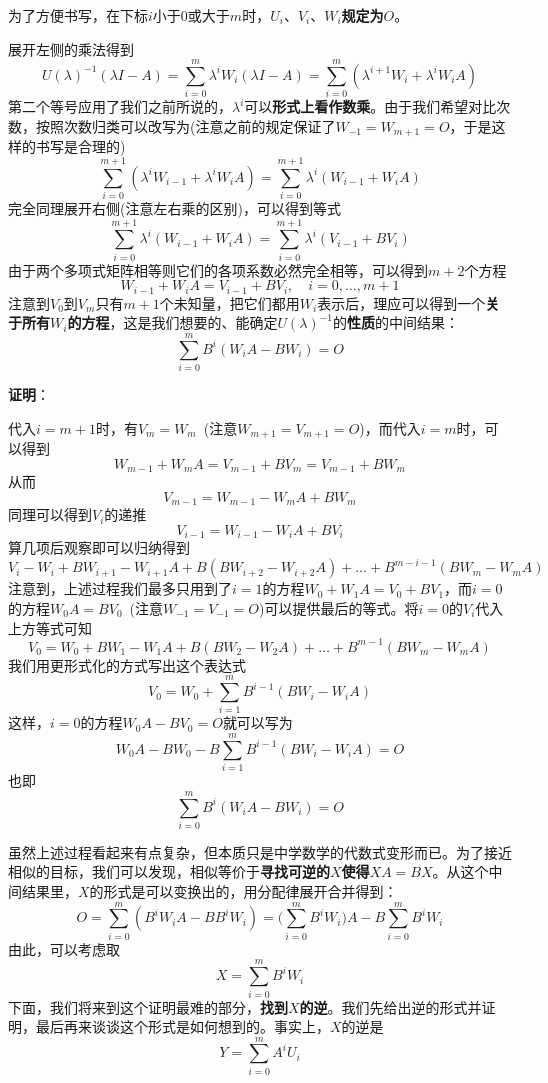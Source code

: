 \documentclass[a4paper,UTF8,fontset=windows,AutoFakeBold]{ctexart}
\newcommand{\proo}[1]{{\vspace{5pt}\kaishu\noindent\textbf{证明}：\vspace{-3pt}
\begin{compactitem}
    \item[] #1
\end{compactitem}
}}
\begin{document}
为了方便书写，在下标$i$小于0或大于$m$时，$U_i$、$V_i$、$W_i$\textbf{规定为}$O$。

展开左侧的乘法得到
$$U(\lambda)^{-1}(\lambda I-A)=\sum_{i=0}^m\lambda^iW_i(\lambda I-A)=\sum_{i=0}^m(\lambda^{i+1}W_i+\lambda^iW_iA)$$
第二个等号应用了我们之前所说的，$\lambda^i$可以\textbf{形式上看作数乘}。由于我们希望对比次数，按照次数归类可以改写为(注意之前的规定保证了$W_{-1}=W_{m+1}=O$，于是这样的书写是合理的)
$$\sum_{i=0}^{m+1}(\lambda^iW_{i-1}+\lambda^iW_iA)=\sum_{i=0}^{m+1}\lambda^i(W_{i-1}+W_iA)$$
完全同理展开右侧(注意左右乘的区别)，可以得到等式
$$\sum_{i=0}^{m+1}\lambda^i(W_{i-1}+W_iA)=\sum_{i=0}^{m+1}\lambda^i(V_{i-1}+BV_i)$$
由于两个多项式矩阵相等则它们的各项系数必然完全相等，可以得到$m+2$个方程
$$W_{i-1}+W_iA=V_{i-1}+BV_i,\quad i=0,\dots,m+1$$
注意到$V_0$到$V_m$只有$m+1$个未知量，把它们都用$W_i$表示后，理应可以得到一个\textbf{关于所有$W_i$的方程}，这是我们想要的、能确定$U(\lambda)^{-1}$的\textbf{性质}的中间结果：
$$\sum_{i=0}^mB^i(W_iA-BW_i)=O$$

\proo{
    代入$i=m+1$时，有$V_m=W_m$\ (注意$W_{m+1}=V_{m+1}=O$)，而代入$i=m$时，可以得到
    $$W_{m-1}+W_mA=V_{m-1}+BV_m=V_{m-1}+BW_m$$
    从而
    $$V_{m-1}=W_{m-1}-W_mA+BW_m$$
    同理可以得到$V_i$的递推
    $$V_{i-1}=W_{i-1}-W_iA+BV_i$$
    算几项后观察即可以归纳得到
    $$V_i-W_i+BW_{i+1}-W_{i+1}A+B(BW_{i+2}-W_{i+2}A)+\dots+B^{m-i-1}(BW_m-W_mA)$$
    注意到，上述过程我们最多只用到了$i=1$的方程$W_0+W_1A=V_0+BV_1$，而$i=0$的方程$W_0A=BV_0$\ (注意$W_{-1}=V_{-1}=O$)可以提供最后的等式。将$i=0$的$V_i$代入上方等式可知
    $$V_0=W_0+BW_1-W_1A+B(BW_2-W_2A)+\dots+B^{m-1}(BW_m-W_mA)$$
    我们用更形式化的方式写出这个表达式
    $$V_0=W_0+\sum_{i=1}^mB^{i-1}(BW_i-W_iA)$$
    这样，$i=0$的方程$W_0A-BV_0=O$就可以写为
    $$W_0A-BW_0-B\sum_{i=1}^mB^{i-1}(BW_i-W_iA)=O$$
    也即
    $$\sum_{i=0}^mB^i(W_iA-BW_i)=O$$
}

虽然上述过程看起来有点复杂，但本质只是中学数学的代数式变形而已。为了接近相似的目标，我们可以发现，相似等价于\textbf{寻找可逆的$X$使得$XA=BX$}。从这个中间结果里，$X$的形式是可以变换出的，用分配律展开合并得到：
$$O=\sum_{i=0}^m(B^iW_iA-BB^iW_i)=\bigg(\sum_{i=0}^mB^iW_i\bigg)A-B\sum_{i=0}^mB^iW_i$$
由此，可以考虑取
$$X=\sum_{i=0}^mB^iW_i$$
下面，我们将来到这个证明最难的部分，\textbf{找到$X$的逆}。我们先给出逆的形式并证明，最后再来谈谈这个形式是如何想到的。事实上，$X$的逆是
$$Y=\sum_{i=0}^mA^iU_i$$
\end{document}
